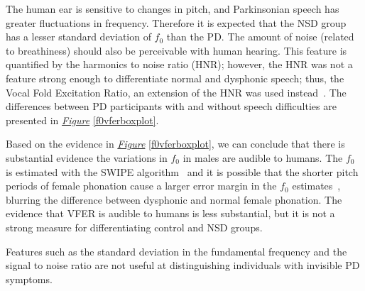 \documentclass[12pt, twoside]{book}
\begin{document}
The human ear is sensitive to changes in pitch, and Parkinsonian speech has greater fluctuations in frequency. Therefore it is expected that the NSD group has a lesser standard deviation of $f_0$ than the PD. The amount of noise (related to breathiness) should also be perceivable with human hearing. This feature is quantified by the harmonics to noise ratio (HNR); however, the HNR was not a feature strong enough to differentiate normal and dysphonic speech; thus, the Vocal Fold Excitation Ratio, an extension of the HNR was used instead~\cite{spoverview}. The differences between PD participants with and without speech difficulties are presented in \textit{\hyperref[f0vferboxplot]{Figure}} \ref{f0vferboxplot}. 





Based on the evidence in \textit{\hyperref[f0vferboxplot]{Figure}} \ref{f0vferboxplot}, we can conclude that there is substantial evidence the variations in $f_0$ in males are audible to humans. The $f_0$ is estimated with the SWIPE algorithm~\cite{camacho2007swipe} and it is possible that the shorter pitch periods of female phonation cause a larger error margin in the $f_0$ estimates~\cite{f0estimation}, blurring the difference between dysphonic and normal female phonation. The evidence that VFER is audible to humans is less substantial, but it is not a strong measure for differentiating control and NSD groups.

\begin{highlight}
	Features such as the standard deviation in the fundamental frequency and the signal to noise ratio are not useful at distinguishing individuals with invisible PD symptoms.
\end{highlight}
\end{document}
